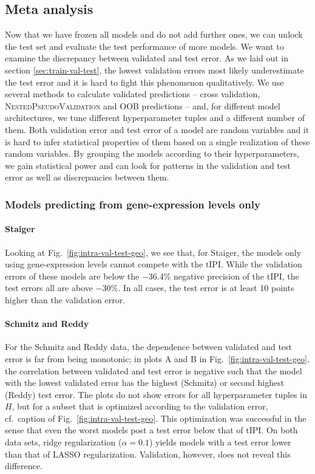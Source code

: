 \subsection{Meta analysis}\label{subsec:results-intra-meta}

Now that we have frozen all models and do not add further ones, we can unlock the test set and 
evaluate the test performance of more models. We want to examine the discrepancy between 
validated and test error. As we laid out in section \ref{sec:train-val-test}, the lowest validation 
errors most likely underestimate the test error and it is hard to fight this 
phenomenon qualitatively. We use several methods to calculate validated predictions -- cross 
validation, \textsc{NestedPseudoValidation} and OOB predictions -- and, for different model 
architectures, we tune different hyperparameter tuples and a different 
number of them. Both validation error and test error of a model are random 
variables and it is hard to infer statistical properties of them based on a single realization of 
these random variables. By grouping the models according to their hyperparameters, we gain 
statistical power and can look for patterns in the validation and test error as well as 
discrepancies between them.

\subsubsection{Models predicting from gene-expression levels only}



\paragraph{Staiger}
Looking at Fig.\ \ref{fig:intra-val-test-geo}, we see that, for Staiger, the models only using 
gene-expression levels cannot compete with the $\text{tIPI}$. While the validation errors of these 
models are 
below the \num{-36.4}\% negative precision of the tIPI, the test errors all are above \num{-30}\%. 
In all cases, the test error is at least 10 points higher than the validation error.  

\paragraph{Schmitz and Reddy}
For the Schmitz and Reddy data, the dependence between validated and test error is far from 
being monotonic; in plots A and B in Fig.\ \ref{fig:intra-val-test-geo}, the
correlation between validated and test 
error is negative such that the model with the lowest validated error has the highest 
(Schmitz) or second highest (Reddy) test error. The plots do not show errors for all 
hyperparameter tuples in $H$, but for a subset that is optimized according to the validation error, 
cf.\ caption of Fig.\ \ref{fig:intra-val-test-geo}. This optimization was successful in the sense 
that even the worst models post a test error below that of $\text{tIPI}$.
On both data sets, ridge 
regularization ($\alpha = \num{0.1}$) yields models with a test error lower than that of LASSO 
regularization. Validation, however, does not reveal this difference. 

